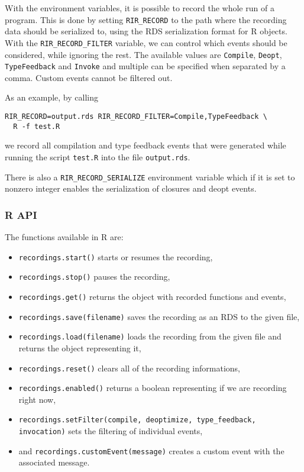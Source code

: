 With the environment variables, it is possible to record the whole run of a program. This is done by setting \texttt{RIR\_RECORD} to the path where the recording data should be serialized to, using the RDS serialization format for R objects\cite[1.8 Serialization Formats]{rprojectInternals}. With the \texttt{RIR\_RECORD\_FILTER} variable, we can control which events should be considered, while ignoring the rest. The available values are \texttt{Compile}, \texttt{Deopt}, \texttt{TypeFeedback} and \texttt{Invoke} and multiple can be specified when separated by a comma. Custom events cannot be filtered out.

As an example, by calling

\begin{verbatim}
RIR_RECORD=output.rds RIR_RECORD_FILTER=Compile,TypeFeedback \
  R -f test.R
\end{verbatim}

\noindent we record all compilation and type feedback events that were generated while running the script \texttt{test.R} into the file \texttt{output.rds}.

There is also a \texttt{RIR\_RECORD\_SERIALIZE} environment variable which if it is set to nonzero integer enables the serialization of closures and deopt events.

\subsubsection*{R API}

The functions available in R are\cite[documentation/recording.md]{rsh-github}:

\begin{itemize}
	\item \texttt{recordings.start()} starts or resumes the recording,
	\item \texttt{recordings.stop()} pauses the recording,
	\item \texttt{recordings.get()} returns the object with recorded functions and events,

	\item \texttt{recordings.save(filename)} saves the recording as an RDS to the given file,
	\item \texttt{recordings.load(filename)} loads the recording from the given file and returns the object representing it,

	\item \texttt{recordings.reset()} clears all of the recording informations,
	\item \texttt{recordings.enabled()} returns a boolean representing if we are recording right now,

	\item \texttt{recordings.setFilter(compile, deoptimize, type\_feedback, invocation)} sets the filtering of individual events,

	\item and \texttt{recordings.customEvent(message)} creates a custom event with the associated message.
\end{itemize}

